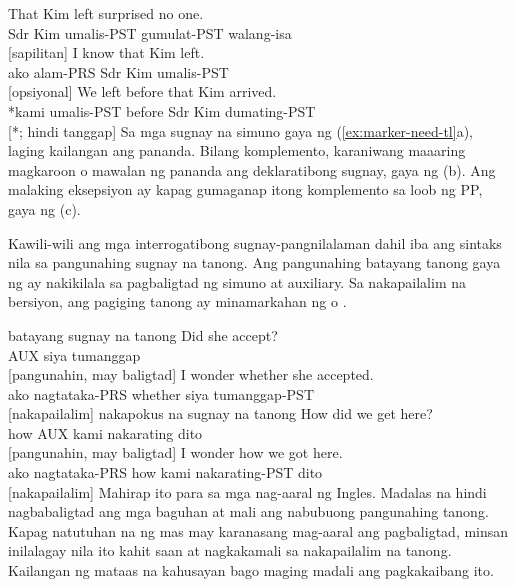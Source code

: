 \ea\label{ex:marker-need-tl}
    \ea \gll That Kim left surprised no one.\\
        Sdr Kim umalis-PST gumulat-PST walang-isa\\
    \glt {} [sapilitan]
    \ex \gll I know that Kim left.\\
        ako alam-PRS Sdr Kim umalis-PST\\
    \glt {} [opsiyonal]
    \ex \gll *We left before that Kim arrived.\\
        *kami umalis-PST before Sdr Kim dumating-PST\\
    \glt {} [*; hindi tanggap]
\z
\z
Sa mga sugnay na simuno gaya ng (\ref{ex:marker-need-tl}a), laging kailangan ang pananda. Bilang komplemento, karaniwang maaaring magkaroon o mawalan ng pananda ang deklaratibong sugnay, gaya ng (b). Ang malaking eksepsiyon ay kapag gumaganap itong komplemento sa loob ng PP, gaya ng (c).

\label{sec:sub-interrog-tl}

Kawili-wili ang mga interrogatibong sugnay-pangnilalaman dahil iba ang sintaks nila sa pangunahing sugnay na tanong. Ang pangunahing batayang tanong gaya ng  ay nakikilala sa pagbaligtad ng simuno at auxiliary. Sa nakapailalim na bersiyon, ang pagiging tanong ay minamarkahan ng  o .

\ea batayang sugnay na tanong\label{ex:int-sub-tl}
    \ea \gll Did she accept?\\
        AUX siya tumanggap\\
    \glt {} [pangunahin, may baligtad]
    \ex \gll I wonder {\ob}whether she accepted{\cb}.\\
        ako nagtataka-PRS whether siya tumanggap-PST\\
    \glt {} [nakapailalim]
    \z
\z
\ea nakapokus na sugnay na tanong
    \ea \gll How did we get here?\\
        how AUX kami nakarating dito\\
    \glt {} [pangunahin, may baligtad]
    \ex \gll I wonder {\ob}how we got here{\cb}.\\
        ako nagtataka-PRS how kami nakarating-PST dito\\
    \glt {} [nakapailalim]
    \z
\z
Mahirap ito para sa mga nag-aaral ng Ingles. Madalas na hindi nagbabaligtad ang mga baguhan at mali ang nabubuong pangunahing tanong. Kapag natutuhan na ng mas may karanasang mag-aaral ang pagbaligtad, minsan inilalagay nila ito kahit saan at nagkakamali sa nakapailalim na tanong. Kailangan ng mataas na kahusayan bago maging madali ang pagkakaibang ito.


